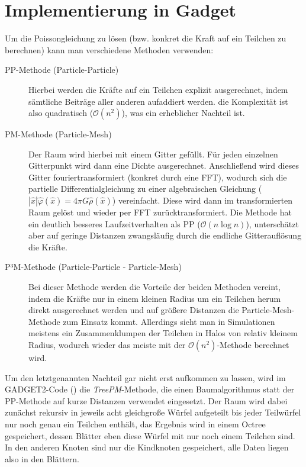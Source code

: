 \documentclass[a4paper]{scrartcl}
\begin{document}
\section{Implementierung in Gadget}
Um die Poissongleichung zu lösen (bzw. konkret die Kraft auf ein Teilchen zu
berechnen) kann man verschiedene Methoden verwenden:
\begin{description}
  \item[PP-Methode (Particle-Particle)]
    Hierbei werden die Kräfte auf ein Teilchen explizit ausgerechnet, indem
    sämtliche Beiträge aller anderen aufaddiert werden. die Komplexität ist also
    quadratisch ($\mathcal O(n^2)$), was ein erheblicher Nachteil ist.
  \item[PM-Methode (Particle-Mesh)]
    Der Raum wird hierbei mit einem Gitter gefüllt. Für jeden einzelnen
    Gitterpunkt wird dann eine Dichte ausgerechnet. Anschließend wird dieses
    Gitter fouriertransformiert (konkret durch eine FFT), wodurch sich die
    partielle Differentialgleichung zu einer algebraischen Gleichung
    ($\left|\hat x\right| \hat \varphi(\hat x) = 4\pi G \hat \rho(\hat x)$)
    vereinfacht. Diese wird dann im transformierten Raum gelöst und wieder per
    FFT zurücktransformiert.  Die Methode hat ein deutlich besseres
    Laufzeitverhalten als PP ($\mathcal O(n\log n)$), unterschätzt aber auf
    geringe Distanzen zwangsläufig durch die endliche Gitterauflösung die
    Kräfte.
  \item[P³M-Methode (Particle-Particle - Particle-Mesh)]
    Bei dieser Methode werden die Vorteile der beiden Methoden vereint, indem
    die Kräfte nur in einem kleinen Radius um ein Teilchen herum direkt
    ausgerechnet werden und auf größere Distanzen die Particle-Mesh-Methode zum
    Einsatz kommt. Allerdings sieht man in Simulationen meistens ein
    Zusammenklumpen der Teilchen in Halos von relativ kleinem Radius, wodurch
    wieder das meiste mit der $\mathcal O (n^2)$-Methode berechnet wird.
\end{description}

Um den letztgenannten Nachteil gar nicht erst aufkommen zu lassen, wird im
GADGET2-Code (\cite{gadget}) die \emph{TreePM}-Methode, die einen
Baumalgorithmus statt der PP-Methode auf kurze Distanzen verwendet eingesetzt.
Der Raum wird dabei zunächst rekursiv in jeweils acht gleichgroße Würfel
aufgeteilt bis jeder Teilwürfel nur noch genau ein Teilchen enthält, das
Ergebnis wird in einem Octree gespeichert, dessen Blätter eben diese Würfel mit
nur noch einem Teilchen sind. In den anderen Knoten sind nur die Kindknoten
gespeichert, alle Daten liegen also in den Blättern.
\end{document}

